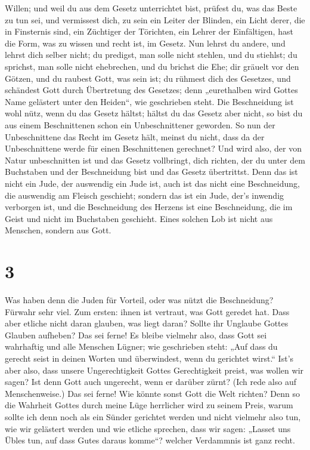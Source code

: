 Willen; und weil du aus dem Gesetz unterrichtet bist, prüfest du, was
das Beste zu tun sei,  und vermissest dich, zu sein ein
Leiter der Blinden, ein Licht derer, die in Finsternis sind,
 ein Züchtiger der Törichten, ein Lehrer der Einfältigen,
hast die Form, was zu wissen und recht ist, im Gesetz. 
Nun lehrst du andere, und lehrst dich selber nicht; du predigst, man
solle nicht stehlen, und du stiehlst;  du sprichst, man
solle nicht ehebrechen, und du brichst die Ehe; dir gräuelt vor den
Götzen, und du raubest Gott, was sein ist;  du rühmest
dich des Gesetzes, und schändest Gott durch Übertretung des Gesetzes;
 denn „eurethalben wird Gottes Name gelästert unter den
Heiden``, wie geschrieben steht.  Die Beschneidung ist
wohl nütz, wenn du das Gesetz hältst; hältst du das Gesetz aber nicht,
so bist du aus einem Beschnittenen schon ein Unbeschnittener geworden.
 So nun der Unbeschnittene das Recht im Gesetz hält,
meinst du nicht, dass da der Unbeschnittene werde für einen
Beschnittenen gerechnet?  Und wird also, der von Natur
unbeschnitten ist und das Gesetz vollbringt, dich richten, der du unter
dem Buchstaben und der Beschneidung bist und das Gesetz übertrittst.
 Denn das ist nicht ein Jude, der auswendig ein Jude ist,
auch ist das nicht eine Beschneidung, die auswendig am Fleisch
geschieht;  sondern das ist ein Jude, der's inwendig
verborgen ist, und die Beschneidung des Herzens ist eine Beschneidung,
die im Geist und nicht im Buchstaben geschieht. Eines solchen Lob ist
nicht aus Menschen, sondern aus Gott.

\hypertarget{section-2}{%
\section{3}\label{section-2}}

 Was haben denn die Juden für Vorteil, oder was nützt die
Beschneidung?  Fürwahr sehr viel. Zum ersten: ihnen ist
vertraut, was Gott geredet hat.  Dass aber etliche nicht
daran glauben, was liegt daran? Sollte ihr Unglaube Gottes Glauben
aufheben?  Das sei ferne! Es bleibe vielmehr also, dass
Gott sei wahrhaftig und alle Menschen Lügner; wie geschrieben steht:
„Auf dass du gerecht seist in deinen Worten und überwindest, wenn du
gerichtet wirst.``  Ist's aber also, dass unsere
Ungerechtigkeit Gottes Gerechtigkeit preist, was wollen wir sagen? Ist
denn Gott auch ungerecht, wenn er darüber zürnt? (Ich rede also auf
Menschenweise.)  Das sei ferne! Wie könnte sonst Gott die
Welt richten?  Denn so die Wahrheit Gottes durch meine
Lüge herrlicher wird zu seinem Preis, warum sollte ich denn noch als ein
Sünder gerichtet werden  und nicht vielmehr also tun, wie
wir gelästert werden und wie etliche sprechen, dass wir sagen: „Lasset
uns Übles tun, auf dass Gutes daraus komme``? welcher Verdammnis ist
ganz recht.

